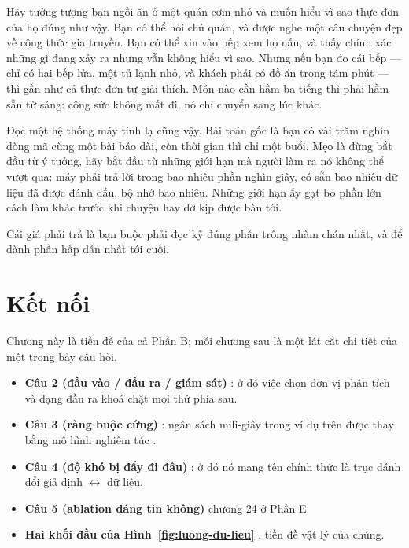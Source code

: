 \documentclass[../../deep_learning.tex]{subfiles}
\begin{document}
\begin{dongian}
Hãy tưởng tượng bạn ngồi ăn ở một quán cơm nhỏ và muốn hiểu vì sao thực đơn của họ đúng như vậy. Bạn có thể hỏi chủ quán, và được nghe một câu chuyện đẹp về công thức gia truyền. Bạn có thể xin vào bếp xem họ nấu, và thấy chính xác những gì đang xảy ra nhưng vẫn không hiểu vì sao. Nhưng nếu bạn đo cái bếp --- chỉ có hai bếp lửa, một tủ lạnh nhỏ, và khách phải có đồ ăn trong tám phút --- thì gần như cả thực đơn tự giải thích. Món nào cần hầm ba tiếng thì phải hầm sẵn từ sáng: công sức không mất đi, nó chỉ chuyển sang lúc khác.

Đọc một hệ thống máy tính lạ cũng vậy. Bài toán gốc là bạn có vài trăm nghìn dòng mã cùng một bài báo dài, còn thời gian thì chỉ một buổi. Mẹo là đừng bắt đầu từ ý tưởng, hãy bắt đầu từ những giới hạn mà người làm ra nó không thể vượt qua: máy phải trả lời trong bao nhiêu phần nghìn giây, có sẵn bao nhiêu dữ liệu đã được đánh dấu, bộ nhớ bao nhiêu. Những giới hạn ấy gạt bỏ phần lớn cách làm khác trước khi chuyện hay dở kịp được bàn tới.

Cái giá phải trả là bạn buộc phải đọc kỹ đúng phần trông nhàm chán nhất, và để dành phần hấp dẫn nhất tới cuối.

\end{dongian}

\section{Kết nối}
Chương này là tiền đề của cả Phần B; mỗi chương sau là một lát cắt chi tiết của một trong bảy câu hỏi.

\begin{itemize}
\item \textbf{Câu 2 (đầu vào / đầu ra / giám sát)} \ra {}: ở đó việc chọn đơn vị phân tích và dạng đầu ra khoá chặt mọi thứ phía sau.
\item \textbf{Câu 3 (ràng buộc cứng)} \ra {}: ngân sách mili-giây trong ví dụ trên được thay bằng mô hình  nghiêm túc \cite{williams2009roofline}.
\item \textbf{Câu 4 (độ khó bị đẩy đi đâu)} \ra {}: ở đó nó mang tên chính thức là trục đánh đổi giả định \(\leftrightarrow\) dữ liệu.
\item \textbf{Câu 5 (ablation đáng tin không)} \ra chương 24 ở Phần E.
\item \textbf{Hai khối đầu của Hình~\ref{fig:luong-du-lieu}} \ra {}, tiền đề vật lý của chúng.
\end{itemize}
\end{document}
